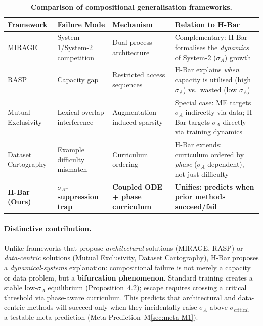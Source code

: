 \documentclass[11pt,a4paper]{article}
\begin{document}
\begin{table}[htbp]
\centering
\caption{\textbf{Comparison of compositional generalisation frameworks.}}
\label{tab:framework-comparison}
\small
\begin{tabular}{>{\raggedright\arraybackslash}p{2.0cm}>{\raggedright\arraybackslash}p{2.5cm}>{\raggedright\arraybackslash}p{2.5cm}>{\raggedright\arraybackslash}p{5.0cm}}
\toprule
\textbf{Framework} & \textbf{Failure Mode} & \textbf{Mechanism} & \textbf{Relation to H-Bar} \\
\midrule
MIRAGE \citep{noviello2025neuroscienceinspiredualprocess}
  & System-1/System-2 competition
  & Dual-process architecture
  & Complementary: H-Bar formalises the \emph{dynamics} of System-2 ($\sigma_A$) growth \\

RASP \citep{bruns2025exploringcompositionalgeneralizationin}
  & Capacity gap
  & Restricted access sequences
  & H-Bar explains \emph{when} capacity is utilised (high $\sigma_A$) vs.\ wasted (low $\sigma_A$) \\

Mutual Exclusivity \citep{jiang2022mutualexclusivity}
  & Lexical overlap interference
  & Augmentation-induced sparsity
  & Special case: ME targets $\sigma_A$-indirectly via data; H-Bar targets $\sigma_A$-directly via training dynamics \\

Dataset Cartography \citep{swayamdipta2020datasetcartography}
  & Example difficulty mismatch
  & Curriculum ordering
  & H-Bar extends: curriculum ordered by \emph{phase} ($\sigma_A$-dependent), not just difficulty \\

\textbf{H-Bar (Ours)}
  & \textbf{$\sigma_A$-suppression trap}
  & \textbf{Coupled ODE + phase curriculum}
  & \textbf{Unifies: predicts when prior methods succeed/fail} \\
\bottomrule
\end{tabular}
\end{table}

\paragraph{Distinctive contribution.}
Unlike frameworks that propose \emph{architectural} solutions (MIRAGE,
RASP) or \emph{data-centric} solutions (Mutual Exclusivity, Dataset
Cartography), H-Bar proposes a \emph{dynamical-systems} explanation:
compositional failure is not merely a capacity or data problem, but a
\textbf{bifurcation phenomenon}. Standard training creates a stable
low-$\sigma_A$ equilibrium (Proposition~4.2); escape requires crossing
a critical threshold via phase-aware curriculum. This predicts that
architectural and data-centric methods will succeed only when they
incidentally raise $\sigma_A$ above $\sigma_{\text{critical}}$---a
testable meta-prediction (Meta-Prediction~M\ref{sec:meta-M1}).
\end{document}

